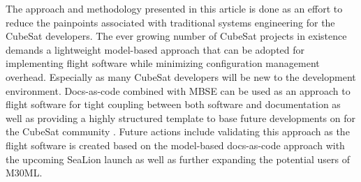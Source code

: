 \documentclass[conf]{new-aiaa}
\begin{document}
The approach and methodology presented in this article is done as an effort to reduce the painpoints associated with traditional systems engineering for the CubeSat developers. The ever growing number of CubeSat projects in existence demands a lightweight model-based approach that can be adopted for implementing flight software while minimizing configuration management overhead. Especially as many CubeSat developers will be new to the development environment. Docs-as-code combined with MBSE can be used as an approach to flight software for tight coupling between both software and documentation as well as providing a highly structured template to base future developments on for the CubeSat community \cite{sealion_mission_architecture}. Future actions include validating this approach as the flight software is created based on the model-based docs-as-code approach with the upcoming SeaLion launch as well as further expanding the potential users of M30ML.




\end{document}

